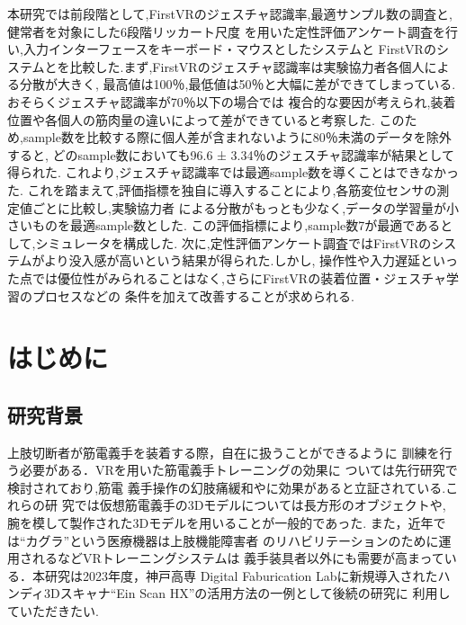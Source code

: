 \documentclass{ltjsreport}
\begin{document}
本研究では前段階として,FirstVRのジェスチャ認識率,最適サンプル数の調査と,健常者を対象にした6段階リッカート尺度
を用いた定性評価アンケート調査を行い,入力インターフェースをキーボード・マウスとしたシステムと
FirstVRのシステムとを比較した.まず,FirstVRのジェスチャ認識率は実験協力者各個人による分散が大きく,
最高値は100％,最低値は50％と大幅に差ができてしまっている.おそらくジェスチャ認識率が70％以下の場合では
複合的な要因が考えられ,装着位置や各個人の筋肉量の違いによって差ができていると考察した.
このため,sample数を比較する際に個人差が含まれないように80％未満のデータを除外すると,
どのsample数においても96.6 ± 3.34％のジェスチャ認識率が結果として得られた.
これより,ジェスチャ認識率では最適sample数を導くことはできなかった.
これを踏まえて,評価指標を独自に導入することにより,各筋変位センサの測定値ごとに比較し,実験協力者
による分散がもっとも少なく,データの学習量が小さいものを最適sample数とした.
この評価指標により,sample数7が最適であるとして,シミュレータを構成した.
次に,定性評価アンケート調査ではFirstVRのシステムがより没入感が高いという結果が得られた.しかし,
操作性や入力遅延といった点では優位性がみられることはなく,さらにFirstVRの装着位置・ジェスチャ学習のプロセスなどの
条件を加えて改善することが求められる.
\clearpage

\setcounter{tocdepth}{2}
\tableofcontents

\clearpage


\chapter{はじめに}
	\section{研究背景}
		上肢切断者が筋電義手を装着する際，自在に扱うことができるように
		訓練を行う必要がある．VRを用いた筋電義手トレーニングの効果に
		ついては先行研究\cite{ref:1}\cite{ref:2}で検討されており,筋電
		義手操作の幻肢痛緩和やに効果があると立証されている.これらの研
		究では仮想筋電義手の3Dモデルについては長方形のオブジェクトや,
		腕を模して製作された3Dモデルを用いることが一般的であった.
		また，近年では``カグラ''\cite{ref:3}という医療機器は上肢機能障害者
		のリハビリテーションのために運用されるなどVRトレーニングシステムは
		義手装具者以外にも需要が高まっている．本研究は2023年度，神戸高専
		Digital Faburication Labに新規導入されたハンディ3Dスキャナ``Ein Scan HX''\cite{ref:4}の活用方法の一例として後続の研究に
		利用していただきたい.
\end{document}
